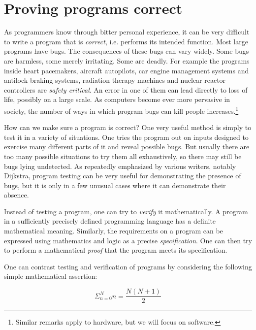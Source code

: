 \chapter{Proving programs correct}

As programmers know through bitter personal experience, it can be very
difficult to write a program that is {\em correct}, i.e. performs its intended
function. Most large programs have bugs. The consequences of these bugs can
vary widely. Some bugs are harmless, some merely irritating. Some are deadly.
For example the programs inside heart pacemakers, aircraft autopilots, car
engine management systems and antilock braking systems, radiation therapy
machines and nuclear reactor controllers are {\em safety critical}. An error in
one of them can lead directly to loss of life, possibly on a large scale. As
computers become ever more pervasive in society, the number of ways in which
program bugs can kill people increases.\footnote{Similar remarks apply to
hardware, but we will focus on software.}

How can we make sure a program is correct? One very useful method is simply to
test it in a variety of situations. One tries the program out on inputs
designed to exercise many different parts of it and reveal possible bugs. But
usually there are too many possible situations to try them all exhaustively, so
there may still be bugs lying undetected. As repeatedly emphasized by various
writers, notably Dijkstra, program testing can be very useful for demonstrating
the presence of bugs, but it is only in a few unusual cases where it can
demonstrate their absence.

Instead of testing a program, one can try to {\em verify} it mathematically. A
program in a sufficiently precisely defined programming language has a definite
mathematical meaning. Similarly, the requirements on a program can be expressed
using mathematics and logic as a precise {\em specification}. One can then try
to perform a mathematical {\em proof} that the program meets its specification.

One can contrast testing and verification of programs by considering the
following simple mathematical assertion:

$$ \Sigma_{n=0}^{N} n = \frac{N (N + 1)}{2} $$

